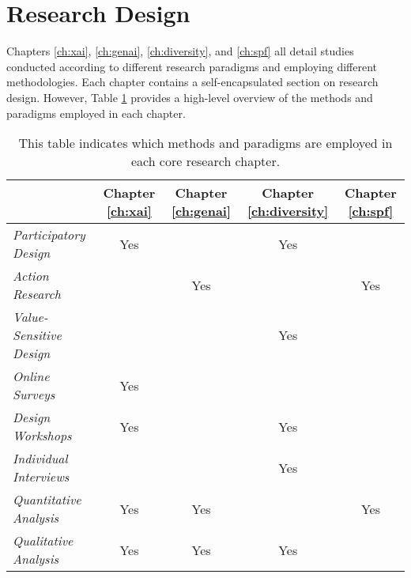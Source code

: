 \section{Research Design}
Chapters \ref{ch:xai}, \ref{ch:genai}, \ref{ch:diversity}, and \ref{ch:spf} all detail studies conducted according to different research paradigms and employing different methodologies. Each chapter contains a self-encapsulated section on research design. However, Table \ref{tab:method_subsections} provides a high-level overview of the methods and paradigms employed in each chapter.

\begin{table}[htbp]
    \centering
    \begin{tabular}{|l|c|c|c|c|}
    \hline
    & \textbf{Chapter \ref{ch:xai}} & \textbf{Chapter \ref{ch:genai}} & \textbf{Chapter \ref{ch:diversity}} & \textbf{Chapter \ref{ch:spf}} \\
    \hline
    \textit{Participatory Design} & Yes & & Yes & \\ 
    \textit{Action Research} & & Yes & & Yes \\ 
    \textit{Value-Sensitive Design} & & & Yes & \\ 
    \hline
    \textit{Online Surveys} & Yes & & & \\ 
    \textit{Design Workshops} & Yes & & Yes & \\ 
    \textit{Individual Interviews} & & & Yes & \\ 
    \textit{Quantitative Analysis} & Yes & Yes & & Yes \\ 
    \textit{Qualitative Analysis} & Yes & Yes & Yes & \\
    \hline
    \end{tabular}
    \caption{This table indicates which methods and paradigms are employed in each core research chapter.}
    \label{tab:method_subsections}
\end{table}
